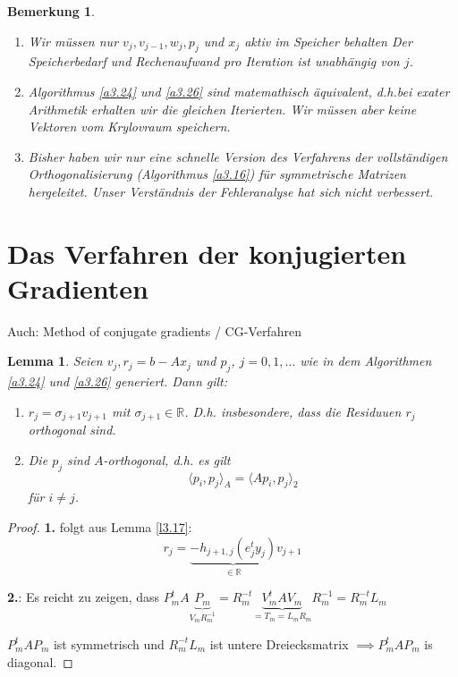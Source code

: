 \documentclass{book}
\newtheorem{lemma}[algorithm]{Lemma}
\newtheorem{remark}[algorithm]{Bemerkung}
\def\R{\mathbb{R}}
\begin{document}
            \begin{remark}\label{b3.27}
                \begin{enumerate}
                    \item Wir müssen nur $v_j,v_{j-1},w_j,p_j$ und $x_j$ aktiv im Speicher behalten
                    Der Speicherbedarf und Rechenaufwand pro Iteration ist unabhängig von $j$.
                    \item Algorithmus \ref{a3.24} und \ref{a3.26} sind matemathisch äquivalent, d.h.bei 
                    exater Arithmetik erhalten wir die gleichen Iterierten. Wir müssen aber keine Vektoren vom Krylovraum speichern.
                    \item Bisher haben wir nur eine schnelle Version des Verfahrens der vollständigen Orthogonalisierung (Algorithmus \ref{a3.16})
                    für symmetrische Matrizen hergeleitet. Unser Verständnis der Fehleranalyse hat sich nicht verbessert.
                \end{enumerate}
            \end{remark}

        \section{Das Verfahren der konjugierten Gradienten}
    
            Auch: Method of conjugate gradients / CG-Verfahren

            \begin{lemma}\label{l3.28}
                Seien $v_j,r_j=b-Ax_j$ und $p_j$, $j=0,1,\dots$ wie in dem Algorithmen \ref{a3.24} und \ref{a3.26} generiert.
                Dann gilt:
                \begin{enumerate}
                    \item $r_j=\sigma_{j+1} v_{j+1}$ mit $\sigma_{j+1}\in\R$. D.h. insbesondere, dass
                    die Residuuen $r_j$ orthogonal sind.
                    \item Die $p_j$ sind $A$-orthogonal, d.h. es gilt \[\langle p_i,p_j \rangle_A=\langle Ap_i,p_j \rangle_2\]
                    für $i\neq j$. 
                \end{enumerate}
            \end{lemma}

            \begin{proof}
                \textbf{1.} folgt aus Lemma \ref{l3.17}:
                \[r_j=\underbrace{-h_{j+1,j}(e_j^ty_j)}_{\in\R}v_{j+1}\]

                \textbf{2.}: Es reicht zu zeigen, dass $P_m^t A\underbrace{P_m}_{V_m R_m^{-1}}=R_m^{-t} \underbrace{V_m^t A V_m}_{=T_m=L_mR_m} R_m^{-1} = R_m^{-t}L_m$

                $P_m^tA P_m$ ist symmetrisch und $R_m^{-t}L_m$ ist untere Dreiecksmatrix $\implies P_m^tA P_m$ is diagonal.

             \end{proof}
\end{document}
